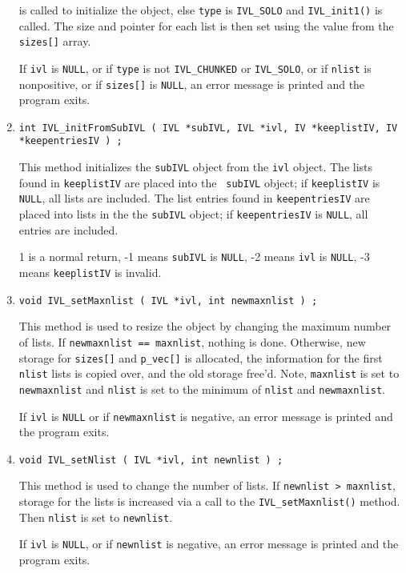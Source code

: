 \begin{enumerate}
is called to initialize the object,
else {\tt type} is {\tt IVL\_SOLO} and {\tt IVL\_init1()}
is called.
The size and pointer for each list is then set using the value from
the {\tt sizes[]} array.
\par {}
If {\tt ivl} is {\tt NULL}, or if {\tt type} is not {\tt IVL\_CHUNKED}
or {\tt IVL\_SOLO},
or if {\tt nlist} is nonpositive, or if {\tt sizes[]} is {\tt NULL},
an error message is printed and the program exits.
\item
\begin{verbatim}
int IVL_initFromSubIVL ( IVL *subIVL, IVL *ivl, IV *keeplistIV, IV *keepentriesIV ) ;
\end{verbatim}
This method initializes the {\tt subIVL} object from the {\tt ivl}
object.
The lists found in {\tt keeplistIV} are placed into the {\tt
subIVL} object; if {\tt keeplistIV} is {\tt NULL}, all lists are
included.
The list entries found in {\tt keepentriesIV} are placed into 
lists in the the {\tt subIVL} object; 
if {\tt keepentriesIV} is {\tt NULL}, all entries are included.
\par {}
1 is a normal return,
-1 means {\tt subIVL} is {\tt NULL},
-2 means {\tt ivl} is {\tt NULL},
-3 means {\tt keeplistIV} is invalid.
\item
\begin{verbatim}
void IVL_setMaxnlist ( IVL *ivl, int newmaxnlist ) ;
\end{verbatim}
This method is used to resize the object 
by changing the maximum number of lists. 
If {\tt newmaxnlist == maxnlist}, nothing is done.
Otherwise, new storage for {\tt sizes[]} and {\tt p\_vec[]} is
allocated, the information for the first {\tt nlist} lists
is copied over, and the old storage free'd.
Note, {\tt maxnlist} is set to {\tt newmaxnlist} 
and {\tt nlist} is set to the minimum of {\tt nlist} 
and {\tt newmaxnlist}.
\par {}
If {\tt ivl} is {\tt NULL} or if {\tt newmaxnlist} is negative,
an error message is printed and the program exits.
\item
\begin{verbatim}
void IVL_setNlist ( IVL *ivl, int newnlist ) ;
\end{verbatim}
This method is used to change the number of lists. 
If {\tt newnlist > maxnlist}, storage for the lists is increased 
via a call to the {\tt IVL\_setMaxnlist()} method.
Then {\tt nlist} is set to {\tt newnlist}.
\par {}
If {\tt ivl} is {\tt NULL}, or if {\tt newnlist} is negative,
an error message is printed and the program exits.
\end{enumerate}
\par
